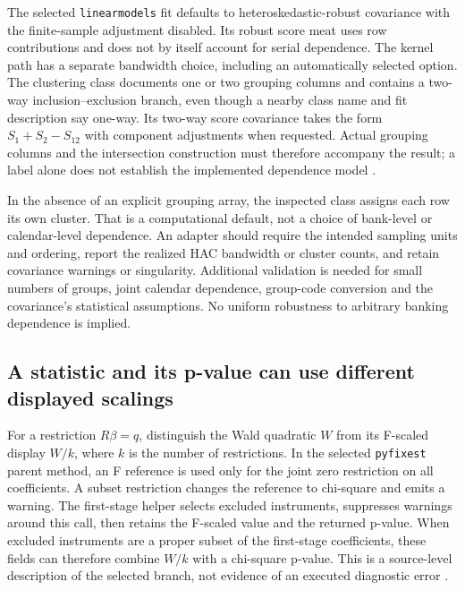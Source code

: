 The selected \texttt{linearmodels} fit defaults to heteroskedastic-robust
covariance with the finite-sample adjustment disabled. Its robust score meat
uses row contributions and does not by itself account for serial dependence.
The kernel path has a separate bandwidth choice, including an automatically
selected option. The clustering class documents one or two grouping columns
and contains a two-way inclusion--exclusion branch, even though a nearby class
name and fit description say one-way. Its two-way score covariance takes the
form $S_1+S_2-S_{12}$ with component adjustments when requested. Actual grouping
columns and the intersection construction must therefore accompany the result;
a label alone does not establish the implemented dependence model
\citep{exec22_pyiv_kernels_linearmodels}.

In the absence of an explicit grouping array, the inspected class assigns
each row its own cluster. That is a computational default, not a choice of
bank-level or calendar-level dependence. An adapter should require the intended
sampling units and ordering, report the realized HAC bandwidth or cluster counts,
and retain covariance warnings or singularity. Additional validation is needed
for small numbers of groups, joint calendar dependence, group-code conversion
and the covariance's statistical assumptions. No uniform robustness to arbitrary
banking dependence is implied.

\subsection{A statistic and its p-value can use different displayed scalings}
\label{exec22:pyiv-diagnostics}

For a restriction $R\beta=q$, distinguish the Wald quadratic $W$ from its
F-scaled display $W/k$, where $k$ is the number of restrictions. In the selected
\texttt{pyfixest} parent method, an F reference is used only for the joint zero
restriction on all coefficients. A subset restriction changes the reference
to chi-square and emits a warning. The first-stage helper selects excluded
instruments, suppresses warnings around this call, then retains the F-scaled
value and the returned p-value. When excluded instruments are a proper subset
of the first-stage coefficients, these fields can therefore combine $W/k$
with a chi-square p-value. This is a source-level description of the selected
branch, not evidence of an executed diagnostic error
\citep{exec22_pyiv_kernels_pyfixest}.

